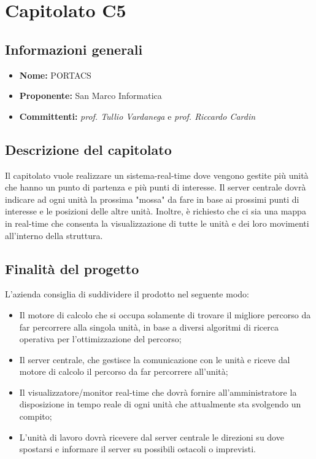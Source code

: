 \section{Capitolato C5}

\subsection{Informazioni generali}
\begin{itemize}
\item \textbf{Nome:} PORTACS
\item \textbf{Proponente:} San Marco Informatica
\item \textbf{Committenti:} \textit{prof. Tullio Vardanega} e \textit{prof. Riccardo Cardin}
\end{itemize}

\subsection{Descrizione del capitolato}
Il capitolato vuole realizzare un sistema-real-time dove vengono gestite più unità che hanno un punto di partenza e più punti di interesse.
Il server centrale dovrà indicare ad ogni unità la prossima "mossa" da fare in base ai prossimi punti di interesse e le posizioni delle altre unità. 
Inoltre, è richiesto che ci sia una mappa in real-time che consenta la visualizzazione di tutte le unità e dei loro movimenti all'interno della struttura.

\subsection{Finalità del progetto}
L'azienda consiglia di suddividere il prodotto nel seguente modo:
\begin{itemize}
\item Il motore di calcolo che si occupa solamente di trovare il migliore percorso da far percorrere alla singola unità, in base a diversi algoritmi di ricerca operativa per l'ottimizzazione del percorso;
\item Il server centrale, che gestisce la comunicazione con le unità e riceve dal motore di calcolo il percorso da far percorrere all'unità;
\item Il visualizzatore/monitor real-time che dovrà fornire all'amministratore la disposizione in tempo reale di ogni unità che attualmente sta svolgendo un compito;
\item L'unità di lavoro dovrà ricevere dal server centrale le direzioni su dove spostarsi e informare il server su possibili ostacoli o imprevisti.
\end{itemize}

